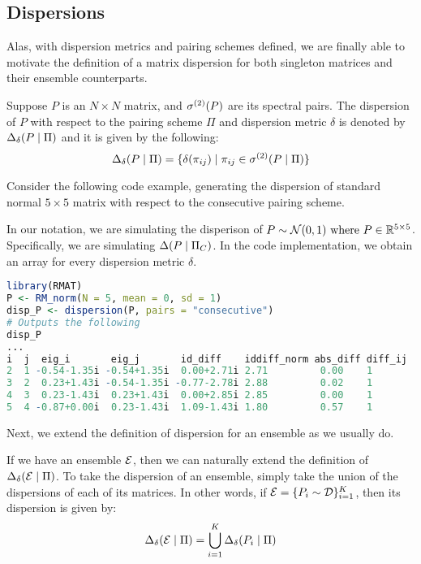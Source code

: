 \subsection{Dispersions}

Alas, with dispersion metrics and pairing schemes defined, we are finally able to motivate the definition of a matrix dispersion for both singleton matrices and their ensemble counterparts.

\begin{definition}[Dispersion]
Suppose $P$ is an $N \times N$ matrix, and ${\sigma^{(2)}}(P)$ are its spectral pairs. The dispersion of $P$ with respect to the pairing scheme $\Pi$ and dispersion metric $\delta$ is denoted by $\Delta_\delta(P \mid \Pi)$ and it is given by the following:
$$\Delta_\delta(P \mid \Pi) = \{\delta({\pi_{ij}}) \mid {\pi_{ij}} \in {\sigma^{(2)}}(P \mid \Pi)\}$$
\end{definition}

Consider the following code example, generating the dispersion of standard normal $5 \times 5$ matrix with respect to the consecutive pairing scheme.

\begin{code}
In our notation, we are simulating the disperison of $P \sim \mathcal{N}(0,1) \text{ where } P \in \mathbb{R}^{5 \times 5}$. Specifically, we are simulating $\Delta(P \mid \Pi_C)$. In the code implementation, we obtain an array for every dispersion metric $\delta$.
\end{code}
\begin{lstlisting}[language=R]
library(RMAT)
P <- RM_norm(N = 5, mean = 0, sd = 1)
disp_P <- dispersion(P, pairs = "consecutive")
# Outputs the following
disp_P
...
i  j  eig_i       eig_j       id_diff    iddiff_norm abs_diff diff_ij
2  1 -0.54-1.35i -0.54+1.35i  0.00+2.71i 2.71         0.00    1
3  2  0.23+1.43i -0.54-1.35i -0.77-2.78i 2.88         0.02    1
4  3  0.23-1.43i  0.23+1.43i  0.00+2.85i 2.85         0.00    1
5  4 -0.87+0.00i  0.23-1.43i  1.09-1.43i 1.80         0.57    1
\end{lstlisting}

Next, we extend the definition of dispersion for an ensemble as we usually do.

\begin{definition}
If we have an ensemble $\mathcal{E}$, then we can naturally extend the definition of $\Delta_\delta(\mathcal{E} \mid \Pi)$. To take the dispersion of an ensemble, simply take the union of the dispersions of each of its matrices. In other words, if $\mathcal{E} = \{P_i \sim \mathcal{D}\}_{i = 1}^K$, then its dispersion is given by:
$$\Delta_\delta(\mathcal{E} \mid \Pi) = \bigcup_{i=1}^K \Delta_\delta(P_i \mid \Pi)$$
\end{definition}

